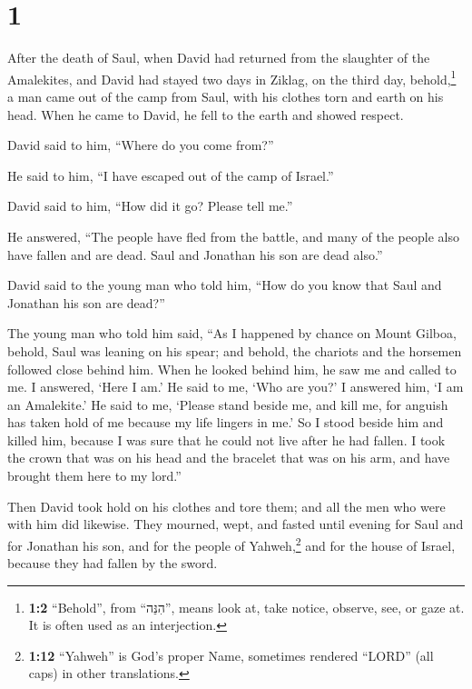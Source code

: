 \hypertarget{section}{%
\section{1}\label{section}}

 After the death of Saul, when David had returned from the
slaughter of the Amalekites, and David had stayed two days in Ziklag,
 on the third day, behold,\footnote{\textbf{1:2}
  ``Behold'', from ``הִנֵּה'', means look at, take notice, observe, see,
  or gaze at. It is often used as an interjection.} a man came out of
the camp from Saul, with his clothes torn and earth on his head. When he
came to David, he fell to the earth and showed respect.

 David said to him, ``Where do you come from?''

He said to him, ``I have escaped out of the camp of Israel.''

 David said to him, ``How did it go? Please tell me.''

He answered, ``The people have fled from the battle, and many of the
people also have fallen and are dead. Saul and Jonathan his son are dead
also.''

 David said to the young man who told him, ``How do you
know that Saul and Jonathan his son are dead?''

 The young man who told him said, ``As I happened by
chance on Mount Gilboa, behold, Saul was leaning on his spear; and
behold, the chariots and the horsemen followed close behind him.
 When he looked behind him, he saw me and called to me. I
answered, `Here I am.'  He said to me, `Who are you?' I
answered him, `I am an Amalekite.'  He said to me, `Please
stand beside me, and kill me, for anguish has taken hold of me because
my life lingers in me.'  So I stood beside him and killed
him, because I was sure that he could not live after he had fallen. I
took the crown that was on his head and the bracelet that was on his
arm, and have brought them here to my lord.''

 Then David took hold on his clothes and tore them; and
all the men who were with him did likewise.  They
mourned, wept, and fasted until evening for Saul and for Jonathan his
son, and for the people of Yahweh,\footnote{\textbf{1:12} ``Yahweh'' is
  God's proper Name, sometimes rendered ``LORD'' (all caps) in other
  translations.} and for the house of Israel, because they had fallen by
the sword.

